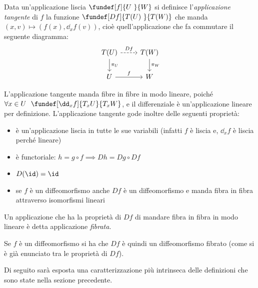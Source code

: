 
\begin{defn}
Data un'applicazione liscia $\fundef[f]{U~}{W}$ si definisce l'\emph{applicazione tangente} di $f$ la funzione $\fundef[Df]{T(U)~}{T(W)}$ che manda $(x,v) \mapsto (f(x), \dd_xf(v))$, cioè quell'applicazione che fa commutare il seguente diagramma:
\begin{equation*}
\begin{tikzcd}
	T(U) \arrow[r, dashrightarrow, "Df"] \arrow[d, "\pi _U"]
		& T(W) \arrow[d, "\pi _W"] \\
	U \arrow[r, "f"]
		& W
\end{tikzcd}
\end{equation*}
\end{defn}

\begin{oss}
L'applicazione tangente manda fibre in fibre in modo lineare, poiché $\forall x\in U\ \ \fundef[\dd_xf]{T_x U}{T_x W}$, e il differenziale è un'applicazione lineare per definizione.
L'applicazione tangente gode inoltre delle seguenti proprietà:
\begin{itemize}
\item è un'applicazione liscia in tutte le sue variabili (infatti $f$ è liscia e, $\dd_xf$ è liscia perché lineare)
\item è functoriale: $h = g\circ f \implies Dh = Dg\circ Df$
\item $D(\id) = \id$
\item se $f$ è un diffeomorfismo anche $Df$ è un diffeomorfismo e manda fibra in fibra attraverso isomorfismi lineari
\end{itemize}
\end{oss}

\begin{defn}
Un applicazione che ha la proprietà di $Df$ di mandare fibra in fibra in modo lineare è detta applicazione \emph{fibrata}.
\end{defn}

Se $f$ è un diffeomorfismo si ha che $Df$ è quindi un diffeomorfismo fibrato (come si è già enunciato tra le proprietà di $Df$).


Di seguito sarà esposta una caratterizzazione più intrinseca delle definizioni che sono state nella sezione precedente.

